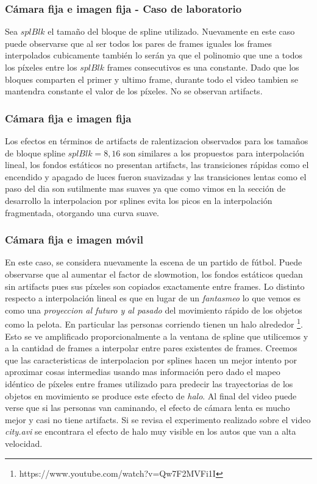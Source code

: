 \subsubsection*{Cámara fija e imagen fija - Caso de laboratorio}
Sea $splBlk$ el tamaño del bloque de spline utilizado. Nuevamente en este caso puede observarse que al ser todos los pares de frames iguales los frames interpolados cubicamente también lo serán ya que el polinomio que une a todos los píxeles entre los $splBlk$ frames consecutivos es una constante. Dado que los bloques comparten el primer y ultimo frame, durante todo el video tambien se mantendra constante el valor de los píxeles. No se observan artifacts.

\subsubsection*{Cámara fija e imagen fija}
Los efectos en términos de artifacts de ralentizacion observados para los tamaños de bloque spline $splBlk = 8, 16$ son similares a los propuestos para interpolación lineal, los fondos estáticos no presentan artifacts, las transiciones rápidas como el encendido y apagado de luces fueron suavizadas y las transiciones lentas como el paso del dia son sutilmente mas suaves ya que como vimos en la sección de desarrollo la interpolacion por splines evita los picos en la interpolación fragmentada, otorgando una curva suave.

\subsubsection*{Cámara fija e imagen móvil}
En este caso, se considera nuevamente la escena de un partido de fútbol. Puede observarse que al aumentar el factor de slowmotion, los fondos estáticos quedan sin artifacts pues sus píxeles son copiados exactamente entre frames. Lo distinto respecto a interpolación lineal es que en lugar de un \emph{fantasmeo} lo que vemos es como una \emph{proyeccion al futuro y al pasado} del movimiento rápido de los objetos como la pelota. En particular las personas corriendo tienen un halo alrededor \footnote{https://www.youtube.com/watch?v=Qw7F2MVFi1I}. Esto se ve amplificado proporcionalmente a la ventana de spline que utilicemos y a la cantidad de frames a interpolar entre pares existentes de frames. Creemos que las caracteristicas de interpolacion por splines hacen un mejor intento por aproximar cosas intermedias usando mas información pero dado el mapeo idéntico de píxeles entre frames utilizado para predecir las trayectorias de los objetos en movimiento se produce este efecto de \emph{halo}. Al final del video puede verse que si las personas van caminando, el efecto de cámara lenta es mucho mejor y casi no tiene artifacts.
Si se revisa el experimento realizado sobre el video \emph{city.avi} se encontrara el efecto de halo muy visible en los autos que van a alta velocidad. 


